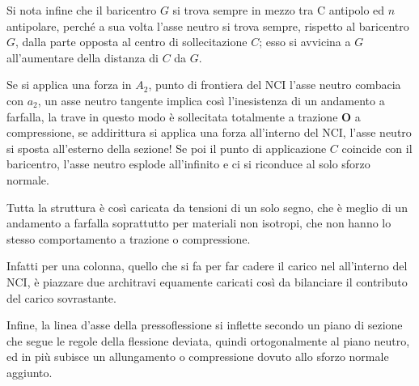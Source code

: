 		Si nota infine che il baricentro $G$ si trova sempre in mezzo tra C antipolo ed $n$ antipolare, perché a sua volta l’asse
		neutro si trova sempre, rispetto al baricentro $ G $, dalla parte opposta al centro di
		sollecitazione $ C $; esso si avvicina a $ G $ all’aumentare della distanza di $ C $ da $ G $. \newline 
		
		Se si applica una forza in $A_2$, punto di frontiera del NCI l'asse neutro combacia con $a_2$, un asse neutro tangente implica così l'inesistenza di un andamento a farfalla, la trave in questo modo è sollecitata totalmente a trazione \textbf{O} a compressione, se addirittura si applica una forza all'interno del NCI, l'asse neutro si sposta all'esterno della sezione! Se poi
		il punto di applicazione $ C $ coincide con il baricentro, l’asse neutro esplode all’infinito e ci si riconduce al solo sforzo
		normale. \newline
	
	
		Tutta la struttura è così caricata da tensioni di un solo segno, che è meglio di un andamento a farfalla soprattutto per materiali non isotropi, che non hanno lo stesso comportamento a trazione o compressione. 
		
		Infatti per una colonna, quello che si fa per far cadere il carico nel all'interno del NCI, è piazzare due architravi equamente caricati così da bilanciare il contributo del carico sovrastante. \newline 
		
		Infine, la linea d'asse della pressoflessione si inflette secondo un piano di sezione che segue le regole della flessione deviata, quindi ortogonalmente al piano neutro, ed in più subisce un allungamento o compressione dovuto allo sforzo normale aggiunto. 
		
